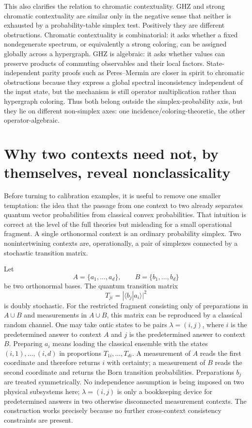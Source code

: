 \documentclass[aps,pra,twocolumn,superscriptaddress,nofootinbib]{revtex4-2}
\begin{document}
This also clarifies the relation to chromatic contextuality.  GHZ and strong chromatic contextuality are similar only in the negative sense that neither is exhausted by a probability-table simplex test.  Positively they are different obstructions.  Chromatic contextuality is combinatorial: it asks whether a fixed nondegenerate spectrum, or equivalently a strong coloring, can be assigned globally across a hypergraph.  GHZ is algebraic: it asks whether values can preserve products of commuting observables and their local factors.  State-independent parity proofs such as Peres--Mermin are closer in spirit to chromatic obstructions because they express a global spectral inconsistency independent of the input state, but the mechanism is still operator multiplication rather than hypergraph coloring.  Thus both belong outside the simplex-probability axis, but they lie on different non-simplex axes: one incidence/coloring-theoretic, the other operator-algebraic.

\section{Why two contexts need not, by themselves, reveal nonclassicality}
\label{sec:two-contexts}

Before turning to calibration examples, it is useful to remove one smaller temptation: the idea that the passage from one context to two already separates quantum vector probabilities from classical convex probabilities.  That intuition is correct at the level of the full theories but misleading for a small operational fragment.  A single orthonormal context is an ordinary probability simplex.  Two nonintertwining contexts are, operationally, a pair of simplexes connected by a stochastic transition matrix.

Let
\begin{equation}
        A=\{a_1,\ldots,a_d\},\qquad B=\{b_1,\ldots,b_d\}
\end{equation}
be two orthonormal bases.  The quantum transition matrix
\begin{equation}
        T_{ji}=|\langle b_j|a_i\rangle|^2
\end{equation}
is doubly stochastic.  For the restricted fragment consisting only of preparations in $A\cup B$ and measurements in $A\cup B$, this matrix can be reproduced by a classical random channel.  One may take ontic states to be pairs $\lambda=(i,j)$, where $i$ is the predetermined answer to context $A$ and $j$ is the predetermined answer to context $B$.  Preparing $a_i$ means loading the classical ensemble with the states $(i,1),\ldots,(i,d)$ in proportions $T_{1i},\ldots,T_{di}$.  A measurement of $A$ reads the first coordinate and therefore returns $i$ with certainty; a measurement of $B$ reads the second coordinate and returns the Born transition probabilities.  Preparations $b_j$ are treated symmetrically.  No independence assumption is being imposed on two physical subsystems here; $\lambda=(i,j)$ is only a bookkeeping device for predetermined answers in two otherwise disconnected measurement contexts.  The construction works precisely because no further cross-context consistency constraints are present.
\end{document}
